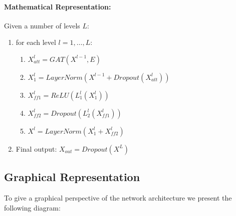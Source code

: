 \documentclass{article}
\begin{document}
	\paragraph*{Mathematical Representation:}
	Given a number of levels $L$:
	\begin{enumerate}
		\item for each level $l=1, \dots, L$:
		\begin{enumerate}
			\item $X_{att}^l = GAT(X^{l-1}, E)$
			\item $X_1^l = LayerNorm(X^{l-1} + Dropout(X_{att}^l))$
			\item $X_{ff1}^l = ReLU(L_1^l(X_1^l))$
			\item $X_{ff2}^l = Dropout(L_2^l(X_{ff1}^l))$
			\item $X^l = LayerNorm(X_1^l + X_{ff2}^l)$
		\end{enumerate}
		\item Final output: $X_{out} = Dropout(X^L)$
	\end{enumerate}
	
	\subsection*{Graphical Representation}
	To give a graphical perspective of the network architecture we present the following diagram:
	
	
\end{document}
